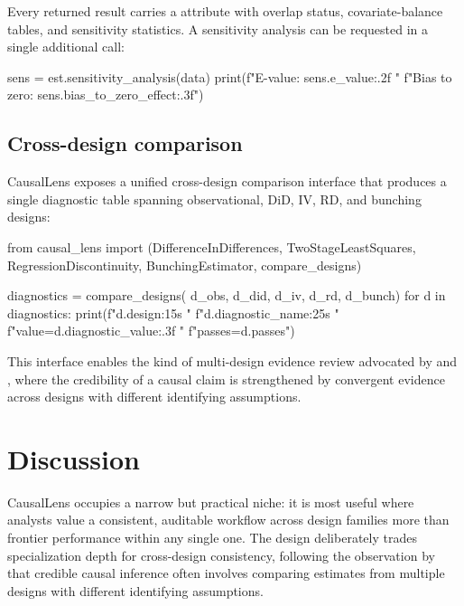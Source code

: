 \documentclass[article]{jss}
\begin{document}
Every returned result carries a  attribute with overlap
status, covariate-balance tables, and sensitivity statistics. A sensitivity
analysis can be requested in a single additional call:

\begin{Code}
sens = est.sensitivity_analysis(data)
print(f"E-value: {sens.e_value:.2f}  "
      f"Bias to zero: {sens.bias_to_zero_effect:.3f}")
\end{Code}

\subsection{Cross-design comparison}\label{sec:cross-api}

CausalLens exposes a unified cross-design comparison interface that
produces a single diagnostic table spanning observational, DiD, IV, RD,
and bunching designs:

\begin{Code}
from causal_lens import (DifferenceInDifferences,
    TwoStageLeastSquares, RegressionDiscontinuity,
    BunchingEstimator, compare_designs)

diagnostics = compare_designs(
    d_obs, d_did, d_iv, d_rd, d_bunch)
for d in diagnostics:
    print(f"{d.design:15s}  "
          f"{d.diagnostic_name:25s}  "
          f"value={d.diagnostic_value:.3f}  "
          f"passes={d.passes}")
\end{Code}

This interface enables the kind of multi-design evidence review advocated
by \citet{AbadieCattaneo2018} and \citet{AtheyImbens2017}, where the
credibility of a causal claim is strengthened by convergent evidence across
designs with different identifying assumptions.



\section{Discussion}\label{sec:discussion}

CausalLens occupies a narrow but practical niche: it is most useful where analysts value a
consistent, auditable workflow across design families more than frontier
performance within any single one. The design deliberately trades
specialization depth for cross-design consistency, following the
observation by \citet{AbadieCattaneo2018} that credible causal inference
often involves comparing estimates from multiple designs with different
identifying assumptions.
\end{document}
